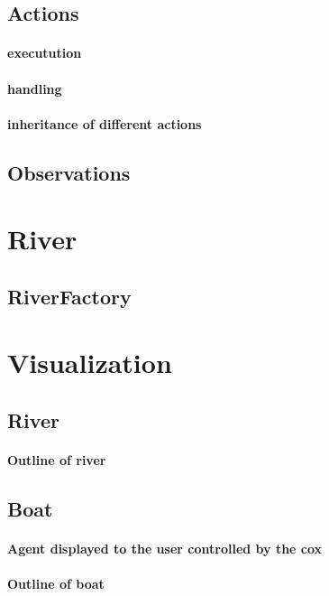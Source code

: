   \subsection{Actions}
    \paragraph{executution}
    \paragraph{handling }
    \paragraph{inheritance of different actions}
  
  \subsection{Observations}
  
\section{River}
  \subsection{RiverFactory}

\section{Visualization}
  \subsection{River}
    \paragraph{Outline of river}
  
  \subsection{Boat}
    \paragraph{Agent displayed to the user controlled by the cox}
    \paragraph{Outline of boat}
